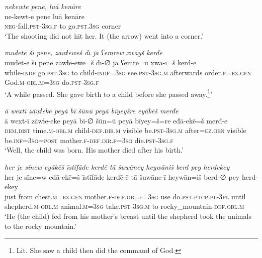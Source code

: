 \ea \label{KŠ.21}
\textit{nekewte pene, luā kenāre} \\ 
\gll ne-kewt-e pene luā kenāre \\ 
 \textsc{neg-}fall\textsc{.pst}\textsc{-3sg}\textsc{.f} to go\textsc{.pst}\textsc{.3sg} corner \\ 
\glt `The shooting did not hit her. It (the arrow) went into a corner.'
\z 
 
\ea \label{KŠ.22}
\textit{mudetē šī pene, zāwɫēweš dī jā ʕemrew xwāyš kerde} \\ 
\gll mudet-ē šī pene zāwɫe-ēwe=š dī-∅ jā ʕemre=ū xwā-ī=š kerd-e \\ 
 while\textsc{-indf} go\textsc{.pst}\textsc{.3sg} to child\textsc{-indf}\textsc{=3sg} see\textsc{.pst}\textsc{-3sg}\textsc{.m} afterwards order\textsc{.f}\textsc{=ez.gen} God\textsc{.m}\textsc{-obl}\textsc{.m}\textsc{=3sg} do\textsc{.pst}\textsc{-3sg}\textsc{.f} \\ 
\glt `A while passed. She gave birth to a child before she passed away.\footnote{Lit. She saw a child then did the command of God.}'
\z 
 
\ea \label{KŠ.23}
\textit{ā wextī zāwɫeke peyā bī šūnū peyā bīyeyšre eyākēš merđe} \\ 
\gll ā wext-ī zāwɫe-eke peyā bī-∅ šūn=ū peyā bīyey=š=re eđā-ekē=š merđ-e \\ 
 \textsc{dem.dist} time\textsc{.m}\textsc{-obl}\textsc{.m} child\textsc{-def}\textsc{.dir}\textsc{.m} visible be\textsc{.pst}\textsc{-3sg}\textsc{.m} after\textsc{=ez.gen} visible be\textsc{.inf}\textsc{=3sg}\textsc{=\textsc{post}} mother\textsc{.f}\textsc{-def}\textsc{.dir}\textsc{.f}\textsc{=3sg} die\textsc{.pst}\textsc{-3sg}\textsc{.f} \\ 
\glt `Well, the child was born. His mother died after his birth.'
\z 
 
\ea \label{KŠ.24}
\textit{her je sīnew eyākēš īstīfāde kerdē tā šuwāney heywāniš berd pey herdekey} \\ 
\gll her je sīne=w eđā-ekē=š īstīfāde kerdē-ē tā šuwāne-ī heywān=iš berd-∅ pey herd-ekey \\ 
 just from chest\textsc{.m}\textsc{=ez.gen} mother\textsc{.f}\textsc{-def}\textsc{.obl}\textsc{.f}\textsc{=3sg} use do\textsc{.pst}\textsc{.ptcp}\textsc{.pl}\textsc{-3pl} until shepherd\textsc{.m}\textsc{-obl}\textsc{.m} animal\textsc{.m}\textsc{=3sg} take\textsc{.pst}\textsc{-3sg}\textsc{.m} to rocky\_mountain\textsc{-def}\textsc{.obl}\textsc{.m} \\ 
\glt `He (the child) fed from his mother’s breast until the shepherd took the animals to the rocky mountain.'
\z 
 
